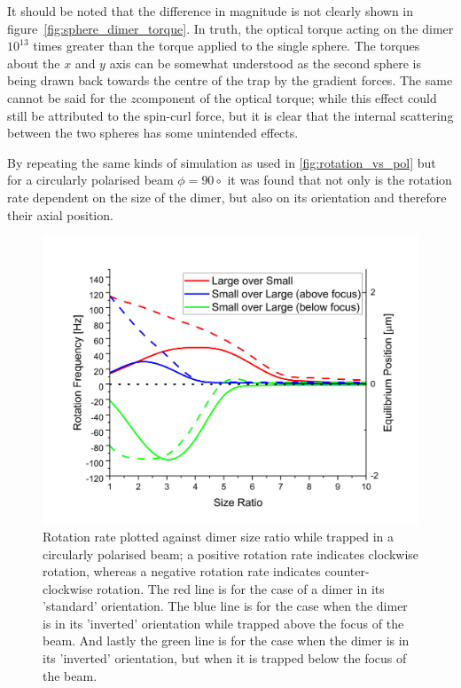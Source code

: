 It should be noted that the difference in magnitude is not clearly shown in 
figure~\ref{fig:sphere_dimer_torque}. In truth, the optical torque acting on 
the dimer $10^{13}$ times greater than the torque applied to the single sphere. 
The torques about the $x$ and $y$ axis can be somewhat understood as the second 
sphere is being drawn back towards the centre of the trap by the gradient forces. 
The same cannot be said for the $z$component of the optical torque; while this 
effect could still be attributed to the spin-curl force, but it is clear that the internal scattering between the two spheres has some unintended effects. 

 By repeating
the same kinds of simulation as used in \ref{fig:rotation_vs_pol} but for
a circularly polarised beam $\phi=90\circ$ it was found that not only is 
the rotation rate dependent on the size of the dimer, but also on its 
orientation and therefore their axial position.
\begin{figure}[h!]
  \centering
  \includegraphics[width=\linewidth]{rotation_rate_vs_size.png}
  \caption{Rotation rate plotted against dimer size ratio while trapped in a
  	circularly polarised beam; a positive rotation rate indicates clockwise 
  	rotation, whereas a negative rotation rate indicates counter-clockwise 
  	rotation. The red line is for the case of a dimer in its 'standard' 
  	orientation. The blue line is for the case when the dimer is in its 
  	'inverted' orientation while trapped above the focus of the beam. And 
  	lastly the green line is for the case when the dimer is in its 
  	'inverted' orientation, but when it is trapped below the focus of the 
  	beam.}
\end{figure}

